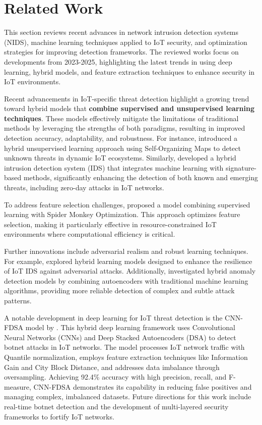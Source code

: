\section{Related Work}
This section reviews recent advances in network intrusion detection systems (NIDS), machine learning techniques applied to IoT security, and optimization strategies for improving detection frameworks. The reviewed works focus on developments from 2023-2025, highlighting the latest trends in using deep learning, hybrid models, and feature extraction techniques to enhance security in IoT environments.

Recent advancements in IoT-specific threat detection highlight a growing trend toward hybrid models that \textbf{combine supervised and unsupervised learning techniques}. These models effectively mitigate the limitations of traditional methods by leveraging the strengths of both paradigms, resulting in improved detection accuracy, adaptability, and robustness. For instance, \citet{kaliyaperumal2024novel} introduced a hybrid unsupervised learning approach using Self-Organizing Maps to detect unknown threats in dynamic IoT ecosystems. Similarly, \citet{tariq2024hybrid} developed a hybrid intrusion detection system (IDS) that integrates machine learning with signature-based methods, significantly enhancing the detection of both known and emerging threats, including zero-day attacks in IoT networks.

To address feature selection challenges, \citet{shenify2024hybrid} proposed a model combining supervised learning with Spider Monkey Optimization. This approach optimizes feature selection, making it particularly effective in resource-constrained IoT environments where computational efficiency is critical.

Further innovations include adversarial realism and robust learning techniques. For example, \citet{vitorino2023realistic} explored hybrid learning models designed to enhance the resilience of IoT IDS against adversarial attacks. Additionally, \citet{zhang2023hybrid} investigated hybrid anomaly detection models by combining autoencoders with traditional machine learning algorithms, providing more reliable detection of complex and subtle attack patterns.

A notable development in deep learning for IoT threat detection is the CNN-FDSA model by \citet{kalidindi2025feature}. This hybrid deep learning framework uses Convolutional Neural Networks (CNNs) and Deep Stacked Autoencoders (DSA) to detect botnet attacks in IoT networks. The model processes IoT network traffic with Quantile normalization, employs feature extraction techniques like Information Gain and City Block Distance, and addresses data imbalance through oversampling. Achieving 92.4\% accuracy with high precision, recall, and F-measure, CNN-FDSA demonstrates its capability in reducing false positives and managing complex, imbalanced datasets. Future directions for this work include real-time botnet detection and the development of multi-layered security frameworks to fortify IoT networks.


